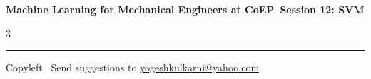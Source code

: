 \documentclass[8pt,landscape]{article}
\begin{document}
\footnotesize

\begin{center}
\Large{\textbf{Machine Learning for Mechanical Engineers at CoEP\ Session 12: SVM}}
\end{center}

\begin{multicols}{3}

\end{multicols}

\rule{\linewidth}{0.25pt}
\scriptsize
Copyleft \textcopyleft\  Send suggestions to
\href{http://www.yogeshkulkarni.com}{yogeshkulkarni@yahoo.com}
\end{document}
